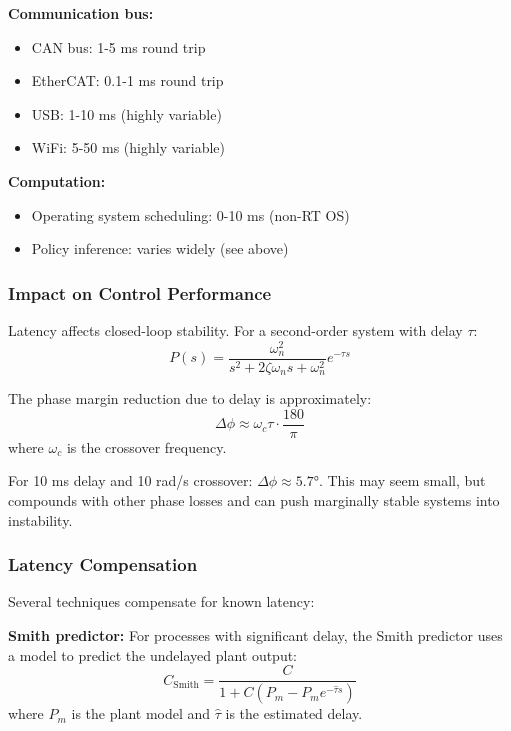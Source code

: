 \textbf{Communication bus:}
\begin{itemize}
    \item CAN bus: 1-5 ms round trip
    \item EtherCAT: 0.1-1 ms round trip
    \item USB: 1-10 ms (highly variable)
    \item WiFi: 5-50 ms (highly variable)
\end{itemize}

\textbf{Computation:}
\begin{itemize}
    \item Operating system scheduling: 0-10 ms (non-RT OS)
    \item Policy inference: varies widely (see above)
\end{itemize}

\subsubsection{Impact on Control Performance}

Latency affects closed-loop stability. For a second-order system with delay $\tau$:
\begin{equation}
P(s) = \frac{\omega_n^2}{s^2 + 2\zeta\omega_n s + \omega_n^2} e^{-\tau s}
\end{equation}

The phase margin reduction due to delay is approximately:
\begin{equation}
\Delta \phi \approx \omega_c \tau \cdot \frac{180}{\pi}
\end{equation}
where $\omega_c$ is the crossover frequency.

For 10 ms delay and 10 rad/s crossover: $\Delta \phi \approx 5.7°$. This may seem small, but compounds with other phase losses and can push marginally stable systems into instability.

\subsubsection{Latency Compensation}

Several techniques compensate for known latency:

\textbf{Smith predictor:} For processes with significant delay, the Smith predictor uses a model to predict the undelayed plant output:
\begin{equation}
C_{\text{Smith}} = \frac{C}{1 + C(P_m - P_m e^{-\hat{\tau}s})}
\end{equation}
where $P_m$ is the plant model and $\hat{\tau}$ is the estimated delay.

